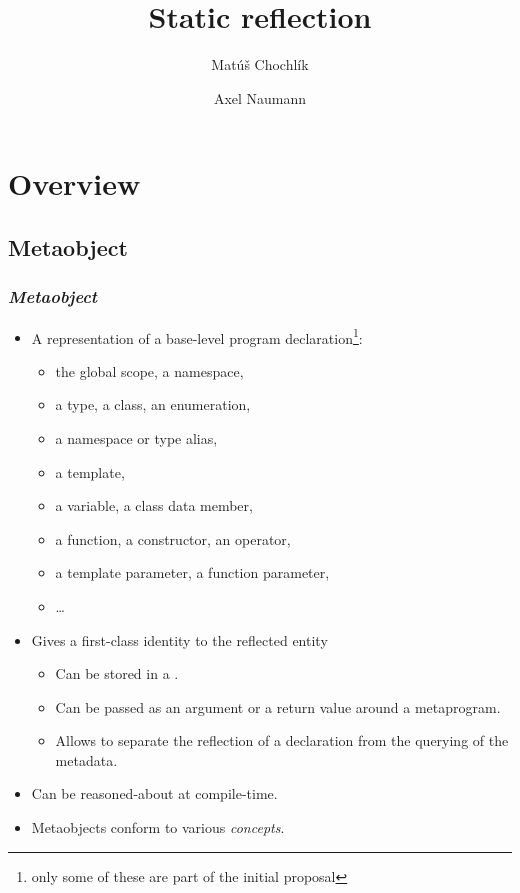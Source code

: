 \documentclass[compress,table,xcolor=table]{beamer}
\author[Chochl\'{i}k M. -- Naumann A.]{Mat\'{u}\v{s} Chochl\'{i}k \and Axel Naumann}
\begin{document}
\title{Static reflection}

\section{Overview}

\subsection{Metaobject}
\begin{frame}
\frametitle{{\em Metaobject}}
  \begin{itemize}
    \small
    \item A representation of a base-level program declaration\footnote
      {only some of these are part of the initial proposal}:
    \begin{itemize}
      \scriptsize
      \item the global scope, a namespace,
      \item a type, a class, an enumeration,
      \item a namespace or type alias,
      \item a template,
      \item a variable, a class data member,
      \item a function, a constructor, an operator,
      \item a template parameter, a function parameter,
      \item \ldots
    \end{itemize}
    \item Gives a first-class identity to the reflected entity
    \begin{itemize}
      \scriptsize
      \item Can be stored in a .
      \item Can be passed as an argument or a return value around a metaprogram.
      \item Allows to separate the reflection of a declaration from
      the querying of the metadata.
    \end{itemize}
    \item Can be reasoned-about at compile-time.
    \item Metaobjects conform to various {\em concepts}.
  \end{itemize}
\end{frame}
\end{document}
